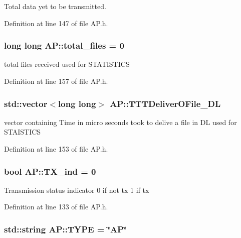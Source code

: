Total data yet to be transmitted. 



Definition at line 147 of file A\-P.\-h.

\hypertarget{classAP_aac5ade30eaf4b86c9b32ff7d37974a55}{
\subsubsection[{total\-\_\-files}]{\setlength{\rightskip}{0pt plus 5cm}long long A\-P\-::total\-\_\-files = 0}}\label{classAP_aac5ade30eaf4b86c9b32ff7d37974a55}


total files received used for S\-T\-A\-T\-I\-S\-T\-I\-C\-S 



Definition at line 157 of file A\-P.\-h.

\hypertarget{classAP_a09493a33ac1503886caf3628aaf10dc7}{
\subsubsection[{T\-T\-T\-Deliver\-O\-File\-\_\-\-D\-L}]{\setlength{\rightskip}{0pt plus 5cm}std\-::vector$<$long long$>$ A\-P\-::\-T\-T\-T\-Deliver\-O\-File\-\_\-\-D\-L}}\label{classAP_a09493a33ac1503886caf3628aaf10dc7}


vector containing Time in micro seconds took to delive a file in D\-L used for S\-T\-A\-I\-S\-T\-I\-C\-S 



Definition at line 153 of file A\-P.\-h.

\hypertarget{classAP_adce53b419ff50565a7084b8d893c5be1}{
\subsubsection[{T\-X\-\_\-ind}]{\setlength{\rightskip}{0pt plus 5cm}bool A\-P\-::\-T\-X\-\_\-ind = 0}}\label{classAP_adce53b419ff50565a7084b8d893c5be1}
Transmission status indicator 0 if not tx 1 if tx 

Definition at line 133 of file A\-P.\-h.

\hypertarget{classAP_a94adc8854ed270f4f83e7da969793904}{
\subsubsection[{T\-Y\-P\-E}]{\setlength{\rightskip}{0pt plus 5cm}std\-::string A\-P\-::\-T\-Y\-P\-E = \char`\"{}A\-P\char`\"{}}}\label{classAP_a94adc8854ed270f4f83e7da969793904}


